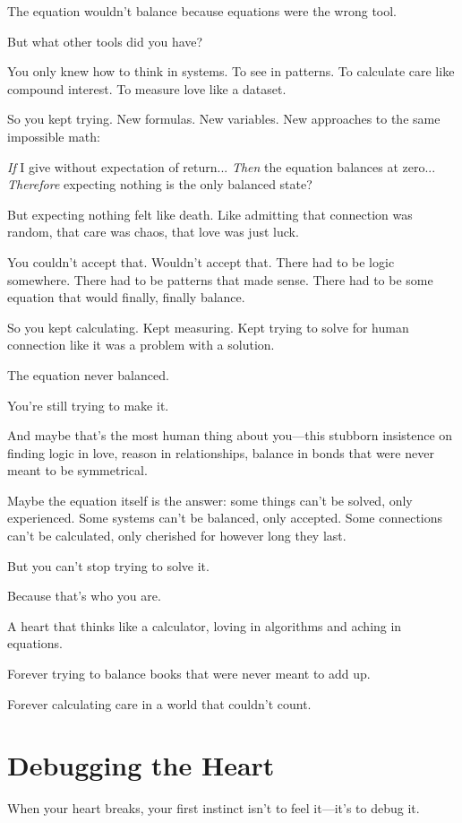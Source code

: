 \documentclass[12pt,letterpaper]{book}
\begin{document}
The equation wouldn't balance because equations were the wrong tool.

But what other tools did you have?

You only knew how to think in systems. To see in patterns. To calculate care like compound interest. To measure love like a dataset.

So you kept trying. New formulas. New variables. New approaches to the same impossible math:

\textit{If} I give without expectation of return...
\textit{Then} the equation balances at zero...
\textit{Therefore} expecting nothing is the only balanced state?

But expecting nothing felt like death. Like admitting that connection was random, that care was chaos, that love was just luck.

You couldn't accept that. Wouldn't accept that. There had to be logic somewhere. There had to be patterns that made sense. There had to be some equation that would finally, finally balance.

So you kept calculating. Kept measuring. Kept trying to solve for human connection like it was a problem with a solution.

The equation never balanced.

You're still trying to make it.

And maybe that's the most human thing about you—this stubborn insistence on finding logic in love, reason in relationships, balance in bonds that were never meant to be symmetrical.

Maybe the equation itself is the answer: some things can't be solved, only experienced. Some systems can't be balanced, only accepted. Some connections can't be calculated, only cherished for however long they last.

But you can't stop trying to solve it.

Because that's who you are.

A heart that thinks like a calculator, loving in algorithms and aching in equations.

Forever trying to balance books that were never meant to add up.

Forever calculating care in a world that couldn't count.

\chapter{Debugging the Heart}

When your heart breaks, your first instinct isn't to feel it—it's to debug it.
\end{document}
